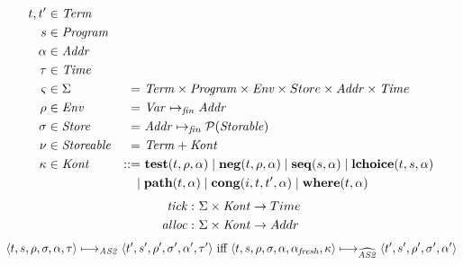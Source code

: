 \documentclass{article}
\begin{document}
{\newcommand{\tick}{\ensuremath \mathit{tick}}
\newcommand{\alloc}{\ensuremath \mathit{alloc}}
\newcommand{\update}[1]{\ensuremath \sqcup[\fresh \mapsto #1]}
\newcommand{\clear}{\ensuremath \mathit{clear}}
\newcommand{\old}{\ensuremath \alpha}
\newcommand{\fresh}{\ensuremath \alpha'}
\newcommand{\rest}{\ensuremath \alpha''}

\begin{alignat*}{2}
  t, t' &\in \mathit{Term} && \\
  s &\in \mathit{Program} && \\
  \alpha &\in \mathit{Addr} && \\
  \tau &\in \mathit{Time} && \\
  \varsigma &\in \Sigma &=&\ \mathit{Term} \times \mathit{Program} \times \mathit{Env} \times Store \times \mathit{Addr} \times \mathit{Time} \\
  \rho &\in \mathit{Env} &=&\ \mathit{Var} \mapsto_{\mathit{fin}} \mathit{Addr} \\
  \sigma &\in \mathit{Store} &=&\ \mathit{Addr} \mapsto_{\mathit{fin}} \mathcal{P}(\mathit{Storable}) \\
  \nu &\in \mathit{Storeable} &=&\ \mathit{Term} + \mathit{Kont} \\
  \kappa &\in \mathit{Kont} &::=&\ \mathbf{test}(t,\rho,\alpha)
                              \; | \; \mathbf{neg}(t,\rho,\alpha)
                              \; | \; \mathbf{seq}(s,\alpha)
                              \; | \; \mathbf{lchoice}(t,s,\alpha) \\
                            &&|&\; \mathbf{path}(t,\alpha)
                              \; | \; \mathbf{cong}(i,t,t',\alpha)
                              \; | \; \mathbf{where}(t,\alpha)
\end{alignat*}
%
\begin{align*}
  \tick  :&\ \Sigma \times \mathit{Kont} \rightarrow Time \\
  \alloc :&\ \Sigma \times \mathit{Kont} \rightarrow Addr
\end{align*}
%
\begin{align*}
  \state{t,s,\rho,\sigma,\alpha,\tau} \longmapsto_{\mathit{AS2}} \state{t',s',\rho',\sigma',\alpha',\tau'} \text{ iff }
  \state{t,s,\rho,\sigma,\alpha,\alpha_\mathit{fresh},\kappa} \longmapsto_{\widehat{\mathit{AS2}}} \state{t',s',\rho',\sigma',\alpha'} \\

\end{align*}}
\end{document}
